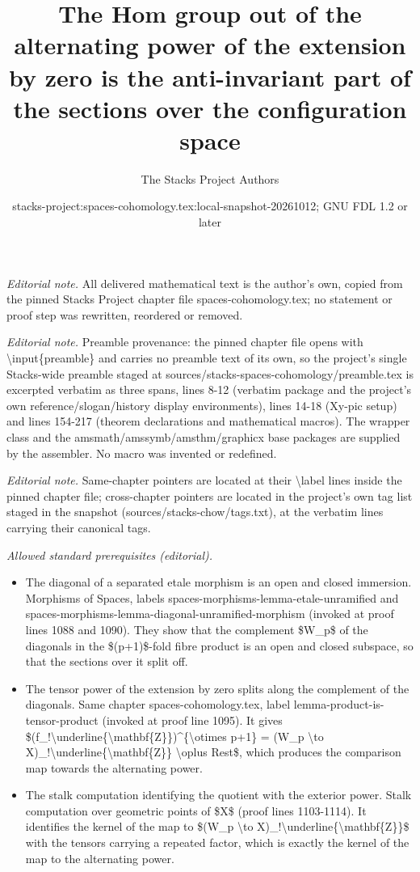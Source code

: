 \documentclass[10pt,a4paper]{amsart}
\title{The Hom group out of the alternating power of the extension by zero is the anti-invariant part of the sections over the configuration space}
\author{The Stacks Project Authors}
\date{stacks-project:spaces-cohomology.tex:local-snapshot-20261012; GNU FDL 1.2 or later}
\theoremstyle{plain}
\theoremstyle{definition}
\theoremstyle{remark}
\numberwithin{equation}{subsection}
\begin{document}
\maketitle
\noindent\textit{Editorial note.} All delivered mathematical text is the author's own, copied from the pinned Stacks Project chapter file spaces-cohomology.tex; no statement or proof step was rewritten, reordered or removed.\par\medskip
\noindent\textit{Editorial note.} Preamble provenance: the pinned chapter file opens with \textbackslash{}input\{preamble\} and carries no preamble text of its own, so the project's single Stacks-wide preamble staged at sources/stacks-spaces-cohomology/preamble.tex is excerpted verbatim as three spans, lines 8-12 (verbatim package and the project's own reference/slogan/history display environments), lines 14-18 (Xy-pic setup) and lines 154-217 (theorem declarations and mathematical macros). The wrapper class and the amsmath/amssymb/amsthm/graphicx base packages are supplied by the assembler. No macro was invented or redefined.\par\medskip
\noindent\textit{Editorial note.} Same-chapter pointers are located at their \textbackslash{}label lines inside the pinned chapter file; cross-chapter pointers are located in the project's own tag list staged in the snapshot (sources/stacks-chow/tags.txt), at the verbatim lines carrying their canonical tags.\par\medskip
\noindent\textit{Allowed standard prerequisites (editorial).}\begin{itemize}
\item The diagonal of a separated etale morphism is an open and closed immersion. Morphisms of Spaces, labels spaces-morphisms-lemma-etale-unramified and spaces-morphisms-lemma-diagonal-unramified-morphism (invoked at proof lines 1088 and 1090). They show that the complement \$W\_p\$ of the diagonals in the \$(p+1)\$-fold fibre product is an open and closed subspace, so that the sections over it split off.
\item The tensor power of the extension by zero splits along the complement of the diagonals. Same chapter spaces-cohomology.tex, label lemma-product-is-tensor-product (invoked at proof line 1095). It gives \$(f\_!\textbackslash{}underline\{\textbackslash{}mathbf\{Z\}\})\textasciicircum{}\{\textbackslash{}otimes p+1\} = (W\_p \textbackslash{}to X)\_!\textbackslash{}underline\{\textbackslash{}mathbf\{Z\}\} \textbackslash{}oplus Rest\$, which produces the comparison map towards the alternating power.
\item The stalk computation identifying the quotient with the exterior power. Stalk computation over geometric points of \$X\$ (proof lines 1103-1114). It identifies the kernel of the map to \$(W\_p \textbackslash{}to X)\_!\textbackslash{}underline\{\textbackslash{}mathbf\{Z\}\}\$ with the tensors carrying a repeated factor, which is exactly the kernel of the map to the alternating power.
\end{itemize}\medskip
\end{document}
